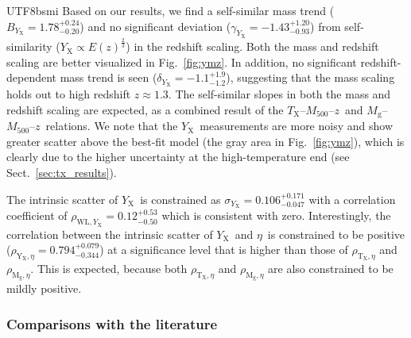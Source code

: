 \documentclass[longauth]{aa}
\newcommand{\Mfiveoo}{\ensuremath{M_{500}}}
\newcommand{\redshift}{\ensuremath{z}}
\newcommand{\Tx}{\ensuremath{T_{\mathrm{X}}}}
\newcommand{\Yx}{\ensuremath{Y_{\mathrm{X}}}}
\newcommand{\Mg}{\ensuremath{M_{\mathrm{g}}}}
\newcommand{\rate}{\ensuremath{\eta}}
\newcommand{\By}{\ensuremath{B_{Y_{\mathrm{X}}}}}
\newcommand{\deltay}{\ensuremath{\delta_{Y_{\mathrm{X}}}}}
\newcommand{\gammay}{\ensuremath{\gamma_{Y_{\mathrm{X}}}}}
\newcommand{\sigmay}{\ensuremath{\sigma_{Y_{\mathrm{X}}}}}
\newcommand{\ansBy}{\ensuremath{ 1.78^{+0.24}_{-0.20} }}
\newcommand{\ansdeltay}{\ensuremath{ -1.1^{+1.9}_{-1.2} }}
\newcommand{\ansgammay}{\ensuremath{ -1.43^{+1.20}_{-0.93} }}
\newcommand{\anssigmay}{\ensuremath{ 0.106^{+0.171}_{-0.047} }}
\newcommand{\ansrhowly}{\ensuremath{ 0.12^{+0.53}_{-0.50} }}
\newcommand{\ansrhoyeta}{\ensuremath{ 0.794^{+0.079}_{-0.344}  }}
\begin{document}
\begin{CJK*}{UTF8}{bsmi}
Based on our results, we find a self-similar mass trend ($\By = \ansBy$)
and no significant deviation ($\gammay = \ansgammay$) from self-similarity ($\Yx\propto{E(\redshift)}^{\frac{2}{3}}$) in the redshift scaling.
Both the mass and redshift scaling are better visualized in Fig.~\ref{fig:ymz}.
In addition, no significant redshift-dependent mass trend is seen ($\deltay = \ansdeltay$), suggesting that the mass scaling holds out to high redshift $\redshift\approx1.3$.
The self-similar slopes in both the mass and redshift scaling are expected, as a combined result of the \Tx--\Mfiveoo--\redshift\ and \Mg--\Mfiveoo--\redshift\ relations.
We note that the \Yx\ measurements are more noisy and show greater scatter above the best-fit model (the gray area in Fig.~\ref{fig:ymz}), 
which is clearly due to the higher uncertainty at the high-temperature end  (see Sect.~\ref{sec:tx_results}).

The intrinsic scatter of \Yx\ is constrained as $\sigmay = \anssigmay$ with a correlation coefficient of $\rho_{\mathrm{WL},\Yx} = \ansrhowly$ which is consistent with zero.
Interestingly, the correlation between the intrinsic scatter of  \Yx\ and \rate\ is constrained to be positive ($\rho_{\mathrm{\Yx},\rate} = \ansrhoyeta$) at a significance level that is higher than those of $\rho_{\mathrm{\Tx},\rate}$ and $\rho_{\mathrm{\Mg},\rate}$.
This is expected, because both 
$\rho_{\mathrm{\Tx},\rate}$ and $\rho_{\mathrm{\Mg},\rate}$ are also constrained to be mildly positive.

\subsubsection*{Comparisons with the literature}


\end{CJK*}
\end{document}

